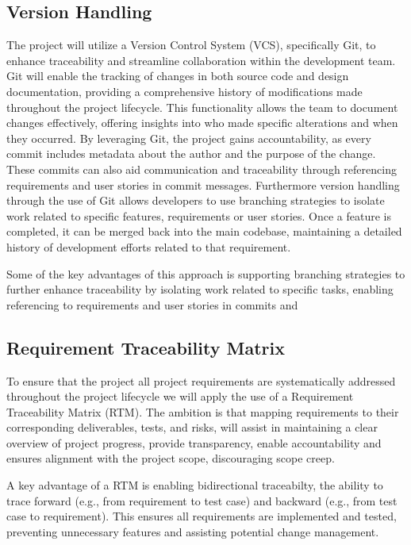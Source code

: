 \documentclass{article}
\begin{document}
\subsection{Version Handling}
The project will utilize a Version Control System (VCS), specifically Git, to enhance traceability and streamline collaboration within the development team. Git will enable the tracking of changes in both source code and design documentation, providing a comprehensive history of modifications made throughout the project lifecycle. This functionality allows the team to document changes effectively, offering insights into who made specific alterations and when they occurred. By leveraging Git, the project gains accountability, as every commit includes metadata about the author and the purpose of the change. These commits can also aid communication and traceability through referencing requirements and user stories in commit messages. Furthermore version handling through the use of Git allows developers to use branching strategies to isolate work related to specific features, requirements or user stories. Once a feature is completed, it can be merged back into the main codebase, maintaining a detailed history of development efforts related to that requirement.

Some of the key advantages of this approach is supporting branching strategies to further enhance traceability by isolating work related to specific tasks, enabling referencing to requirements and user stories in commits and 

\subsection{Requirement Traceability Matrix}
To ensure that the project all project requirements are systematically addressed throughout the project lifecycle we will apply the use of a Requirement Traceability Matrix (RTM). The ambition is that mapping requirements to their corresponding deliverables, tests, and risks, will assist in maintaining a clear overview of project progress, provide transparency, enable accountability and ensures alignment with the project scope, discouraging scope creep.

A key advantage of a RTM is enabling bidirectional traceabilty, the ability to trace forward (e.g., from requirement to test case) and backward (e.g., from test case to requirement). This ensures all requirements are implemented and tested, preventing unnecessary features and assisting potential change management. 
\end{document}
